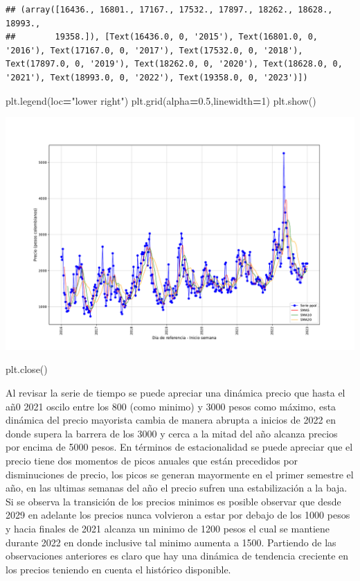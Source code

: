 \documentclass[
]{book}
\newenvironment{Shaded}{\begin{snugshade}}{\end{snugshade}}
\newcommand{\DecValTok}[1]{\textcolor[rgb]{0.00,0.00,0.81}{#1}}
\newcommand{\FloatTok}[1]{\textcolor[rgb]{0.00,0.00,0.81}{#1}}
\newcommand{\NormalTok}[1]{#1}
\newcommand{\OperatorTok}[1]{\textcolor[rgb]{0.81,0.36,0.00}{\textbf{#1}}}
\newcommand{\StringTok}[1]{\textcolor[rgb]{0.31,0.60,0.02}{#1}}
\begin{document}
\begin{verbatim}
## (array([16436., 16801., 17167., 17532., 17897., 18262., 18628., 18993.,
##        19358.]), [Text(16436.0, 0, '2015'), Text(16801.0, 0, '2016'), Text(17167.0, 0, '2017'), Text(17532.0, 0, '2018'), Text(17897.0, 0, '2019'), Text(18262.0, 0, '2020'), Text(18628.0, 0, '2021'), Text(18993.0, 0, '2022'), Text(19358.0, 0, '2023')])
\end{verbatim}

\begin{Shaded}
\begin{Highlighting}[]
\NormalTok{plt.legend(loc}\OperatorTok{=}\StringTok{"lower right"}\NormalTok{)}
\NormalTok{plt.grid(alpha}\OperatorTok{=}\FloatTok{0.5}\NormalTok{,linewidth}\OperatorTok{=}\DecValTok{1}\NormalTok{)}
\NormalTok{plt.show()}
\end{Highlighting}
\end{Shaded}

\includegraphics{bookdown-demo_files/figure-latex/unnamed-chunk-75-43.pdf}

\begin{Shaded}
\begin{Highlighting}[]
\NormalTok{plt.close()}
\end{Highlighting}
\end{Shaded}

Al revisar la serie de tiempo se puede apreciar una dinámica precio que hasta el añ0 2021 oscilo entre los 800 (como minimo) y 3000 pesos como máximo, esta dinámica del precio mayorista cambia de manera abrupta a inicios de 2022 en donde supera la barrera de los 3000 y cerca a la mitad del año alcanza precios por encima de 5000 pesos. En términos de estacionalidad se puede apreciar que el precio tiene dos momentos de picos anuales que están precedidos por disminuciones de precio, los picos se generan mayormente en el primer semestre el año, en las ultimas semanas del año el precio sufren una estabilización a la baja. Si se observa la transición de los precios minimos es posible observar que desde 2029 en adelante los precios nunca volvieron a estar por debajo de los 1000 pesos y hacia finales de 2021 alcanza un minimo de 1200 pesos el cual se mantiene durante 2022 en donde inclusive tal minimo aumenta a 1500. Partiendo de las observaciones anteriores es claro que hay una dinámica de tendencia creciente en los precios teniendo en cuenta el histórico disponible.
\end{document}
